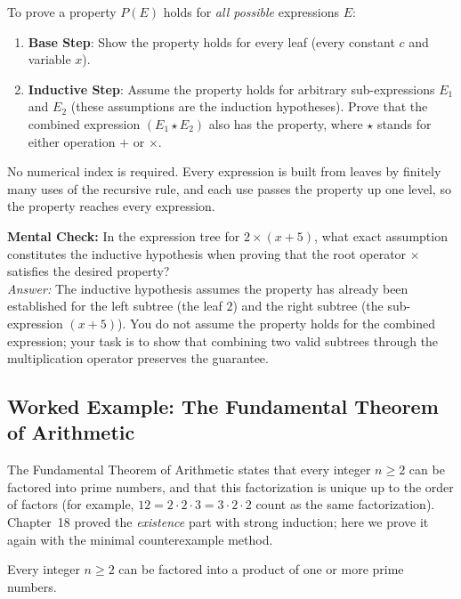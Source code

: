 To prove a property $P(E)$ holds for \emph{all possible} expressions $E$:
\begin{enumerate}
  \item \textbf{Base Step}: Show the property holds for every leaf (every constant $c$ and variable $x$).
  \item \textbf{Inductive Step}: Assume the property holds for arbitrary sub-expressions $E_1$ and $E_2$ (these assumptions are the induction hypotheses). Prove that the combined expression $(E_1 \star E_2)$ also has the property, where $\star$ stands for either operation $+$ or $\times$.
\end{enumerate}

No numerical index is required. Every expression is built from leaves by finitely many uses of the recursive rule, and each use passes the property up one level, so the property reaches every expression.

\begin{walkbox}
\textbf{Mental Check:} In the expression tree for $2 \times (x + 5)$, what exact assumption constitutes the inductive hypothesis when proving that the root operator $\times$ satisfies the desired property?
\\[0.3em]
\emph{Answer:} The inductive hypothesis assumes the property has already been established for the left subtree (the leaf $2$) and the right subtree (the sub-expression $(x+5)$). You do not assume the property holds for the combined expression; your task is to show that combining two valid subtrees through the multiplication operator preserves the guarantee.
\end{walkbox}

\subsection{Worked Example: The Fundamental Theorem of Arithmetic}

The Fundamental Theorem of Arithmetic states that every integer $n \ge 2$ can be factored into prime numbers, and that this factorization is unique up to the order of factors (for example, $12 = 2 \cdot 2 \cdot 3 = 3 \cdot 2 \cdot 2$ count as the same factorization). Chapter~18 proved the \emph{existence} part with strong induction; here we prove it again with the minimal counterexample method.

\begin{theorem}
Every integer $n \ge 2$ can be factored into a product of one or more prime numbers.
\end{theorem}

